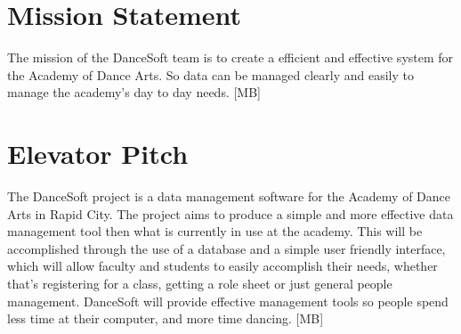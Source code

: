 
\section{Mission Statement}
The mission of the DanceSoft team is to create a efficient and effective system for the Academy of Dance Arts. So data can be managed clearly and easily to manage the academy's day to day needs. [MB]

\section{Elevator Pitch}
The DanceSoft project is a data management software for the Academy of Dance Arts in Rapid City. The project aims to produce a simple and more effective data management tool then what is currently in use at the academy. This will be accomplished through the use of a database and a simple user friendly interface, which will allow faculty and students to easily accomplish their needs, whether that's registering for a class, getting a role sheet or just general people management. DanceSoft will provide effective management tools so people spend less time at their computer, and more time dancing. [MB]
